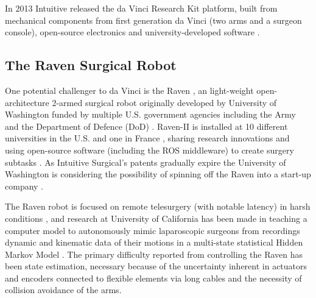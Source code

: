 In 2013 Intuitive released the da Vinci Research Kit platform, built from mechanical components from first generation da Vinci (two arms and a surgeon console), open-source electronics and university-developed software \citep{bib:raven_observ}.

\subsection{The Raven Surgical Robot}
One potential challenger to da Vinci is the Raven \cite{bib:mddi}, an light-weight open-architecture 2-armed surgical robot \citep{bib:raven_debride,bib:raven_ii} originally developed by University of Washington funded by multiple U.S. government agencies including the Army and the Department of Defence (DoD) \citep[p 27]{bib:surgical_book}.
Raven-II is installed at 10 different universities in the U.S. and one in France \citep{bib:raven_ii}, sharing research innovations and using open-source software (including the ROS middleware) to create surgery subtasks \citep{bib:raven_debride}. 
As Intuitive Surgical's patents gradually expire the University of Washington is considering the possibility of spinning off the Raven into a start-up company \citep{bib:economist}.

The Raven robot is focused on remote telesurgery (with notable latency) in harsh conditions \citep{bib:docatadist}, and research at University of California has been made in teaching a computer model to autonomously mimic laparoscopic surgeons from recordings dynamic and kinematic data of their motions in a multi-state statistical Hidden Markov Model \citep{bib:economist}. 
The primary difficulty reported from controlling the Raven has been state estimation, necessary because of the uncertainty inherent in actuators and encoders connected to flexible elements via long cables \citep{bib:raven_debride} and the necessity of collision avoidance of the arms.



































